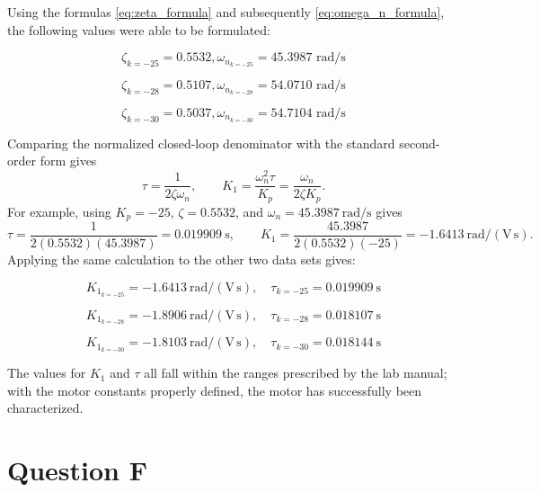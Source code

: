 \documentclass[11pt, letterpaper]{article}
\begin{document}
Using the formulas \ref{eq:zeta_formula} and subsequently \ref{eq:omega_n_formula},
the following values were able to be formulated:

\begin{equation}
    \zeta_{k=-25} = 0.5532, \omega_{n_{k=-25}} = 45.3987 \text{ rad/s}
\end{equation}

\begin{equation}
    \zeta_{k=-28} = 0.5107, \omega_{n_{k=-28}} = 54.0710 \text{ rad/s}
\end{equation}

\begin{equation}
    \zeta_{k=-30} = 0.5037, \omega_{n_{k=-30}} = 54.7104 \text{ rad/s}
\end{equation}

Comparing the normalized closed-loop denominator with the standard
second-order form gives
\[
    \tau = \frac{1}{2\zeta\omega_n}, \qquad
    K_1 = \frac{\omega_n^2\tau}{K_p}
    = \frac{\omega_n}{2\zeta K_p}.
\]
For example, using $K_p=-25$, $\zeta=0.5532$, and
$\omega_n=45.3987\ \mathrm{rad/s}$ gives
\[
    \tau = \frac{1}{2(0.5532)(45.3987)}
    = 0.019909\ \mathrm{s}, \qquad
    K_1 = \frac{45.3987}{2(0.5532)(-25)}
    = -1.6413\ \mathrm{rad/(V\,s)}.
\]
Applying the same calculation to the other two data sets gives:

\begin{equation}
    K_{1_{k=-25}} = -1.6413\ \mathrm{rad/(V\,s)}, \quad
    \tau_{k=-25} = 0.019909\ \mathrm{s}
\end{equation}

\begin{equation}
    K_{1_{k=-28}} = -1.8906\ \mathrm{rad/(V\,s)}, \quad
    \tau_{k=-28} = 0.018107\ \mathrm{s}
\end{equation}

\begin{equation}
    K_{1_{k=-30}} = -1.8103\ \mathrm{rad/(V\,s)}, \quad
    \tau_{k=-30} = 0.018144\ \mathrm{s}
\end{equation}

The values for $K_1$ and $\tau$ all fall within the ranges prescribed by the lab manual;
with the motor constants properly defined, the motor has successfully been characterized.

\section{Question F}
\end{document}
